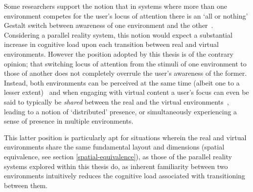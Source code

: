 

Some researchers support the notion that in systems where more than one environment competes for the user's locus of attention there is an `all or nothing' Gestalt switch between awareness of one environment and the other~\cite{Slater2002}. Considering a parallel reality system, this notion would expect a substantial increase in cognitive load upon each transition between real and virtual environments. However the position adopted by this thesis is of the contrary opinion; that switching locus of attention from the stimuli of one environment to those of another does not completely overrule the user's awareness of the former. Instead, both environments can be perceived at the same time (albeit one to a lesser extent)~\cite{Ijsselsteijn2001} and when engaging with virtual content a user's focus can even be said to typically be \textit{shared} between the real and the virtual environments~\cite{Waterworth2001}, leading to a notion of `distributed' presence, or simultaneously experiencing a sense of presence in multiple environments.

This latter position is particularly apt for situations wherein the real and virtual environments share the same fundamental layout and dimensions (spatial equivalence, see section \ref{spatial-equivalence}), as those of the parallel reality systems explored within this thesis do, as inherent familiarity between two environments intuitively reduces the cognitive load associated with transitioning between them.

